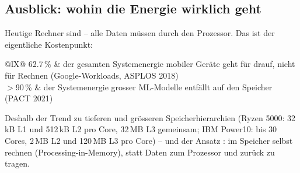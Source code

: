 \subsection{Ausblick: wohin die Energie wirklich geht}
\label{sec:ausblick}
Heutige Rechner sind  -- alle Daten müssen durch
den Prozessor. Das ist der eigentliche Kostenpunkt:
\begin{ztab}{@{}lX@{}}
62.7\,\% & der gesamten Systemenergie mobiler Geräte geht für
   drauf, nicht für Rechnen (Google-Workloads,
  ASPLOS 2018) \\
$>$90\,\% & der Systemenergie grosser ML-Modelle entfällt auf den
  Speicher (PACT 2021) \\
\end{ztab}
Deshalb der Trend zu tieferen und grösseren Speicherhierarchien
(Ryzen 5000: 32\,kB L1 und 512\,kB L2 pro Core, 32\,MB L3 gemeinsam;
IBM Power10: bis 30 Cores, 2\,MB L2 und 120\,MB L3 pro Core) -- und der
Ansatz : im Speicher selbst rechnen
(Processing-in-Memory), statt Daten zum Prozessor und zurück zu tragen.

